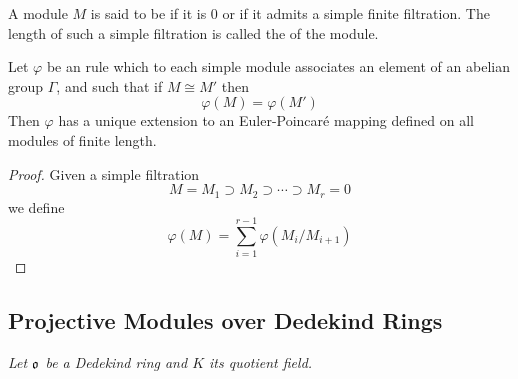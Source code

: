   \begin{defn}
    A module $M$ is said to be  if it is $0$ or if it admits a simple finite filtration. The length of such a simple filtration is called the  of the module.
  \end{defn}


  \begin{thm}
    Let $\varphi$ be an rule which to each simple module associates an element of an abelian group $\Gamma$, and such that if $M\cong M'$ then
    \begin{equation*}
      \varphi(M)=\varphi(M')
    \end{equation*}
    Then $\varphi$ has a unique extension to an Euler-Poincar\'{e} mapping defined on all modules of finite length.
  \end{thm}
  \begin{proof}
    Given a simple filtration
    \begin{equation*}
      M=M_1\supset M_2\supset\cdots\supset M_r=0
    \end{equation*}
    we define
    \begin{equation*}
      \varphi(M)=\sum_{i=1}^{r-1} \varphi(M_i/M_{i+1})
    \end{equation*}
  \end{proof}

\subsection{Projective Modules over Dedekind Rings}
  \emph{Let $\mathfrak{o}$ be a Dedekind ring and $K$ its quotient field.}

